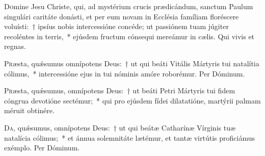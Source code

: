 \documentclass[vesperale_romanum.tex]{subfiles}
\begin{document}

\duplexmtv

\oratio

\lettrine{D}{o}mine Jesu Christe, qui, ad mystérium crucis prædicándum, sanctum Paulum singulári caritáte donásti, et per eum novam in Ecclésia famíliam floréscere voluísti:~† ipsíus nobis intercessióne concéde; ut passiónem tuam júgiter recoléntes in terris,~* ejúsdem fru\-ctum cónsequi mereámur in cælis.
Qui vivis et regnas.


\oratio

\lettrine{P}{r}æsta, quǽsumus omnípotens Deus:~† ut qui beáti Vitális Mártyris tui natalítia cólimus,~* intercessióne ejus in tui nóminis amóre roborémur. Per Dóminum.

\capitdeseq

\myrule


\duplex

\oratio
 \lettrine{P}{r}æsta, quǽsumus, omnípotens Deus:~† ut beáti Petri Mártyris tui fidem cóngrua devotióne sectémur;~* qui pro ejúsdem fídei dilatatióne, martýrii palmam méruit obtinére.
   
   \capitdeseq   
\myrule


\duplex

\oratio

\lettrine{D}{a}, quǽsumus, omnípotens Deus:~† ut qui beátæ Catharínæ Vírginis tuæ natalícia cólimus;~* et ánnua sole\-mnitáte lætémur, et tantæ virtútis proficiámus exémplo.
Per Dóminum.



\myrule

\newpage


\end{document}
